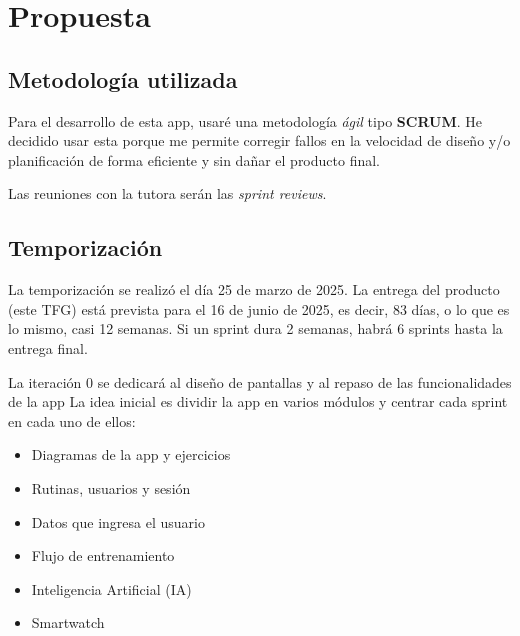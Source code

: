 \chapter{Propuesta}


\section{Metodolog\'ia utilizada}
Para el desarrollo de esta app, usar\'e una metodolog\'ia \textit{\'agil} tipo \textbf{SCRUM}. He decidido usar esta porque me permite corregir fallos en la velocidad de dise\~no y/o planificaci\'on de forma eficiente y sin da\~nar el producto final.

Las reuniones con la tutora ser\'an las \textit{sprint reviews}.

\section{Temporizaci\'on}
La temporizaci\'on se realiz\'o el d\'ia 25 de marzo de 2025. La entrega del producto (este TFG) est\'a prevista para el 16 de junio de 2025, es decir, 83 d\'ias, o lo que es lo mismo, casi 12 semanas. Si un sprint dura 2 semanas, habr\'a 6 sprints hasta la entrega final.

La iteraci\'on 0 se dedicar\'a al dise\~no de pantallas y al repaso de las funcionalidades de la app 
La idea inicial es dividir la app en varios m\'odulos y centrar cada sprint en cada uno de ellos:

\begin{itemize}  %
  \item Diagramas de la app y ejercicios
  \item Rutinas, usuarios y sesi\'on
  \item Datos que ingresa el usuario
  \item Flujo de entrenamiento
  \item Inteligencia Artificial (IA)
  \item Smartwatch
\end{itemize}

